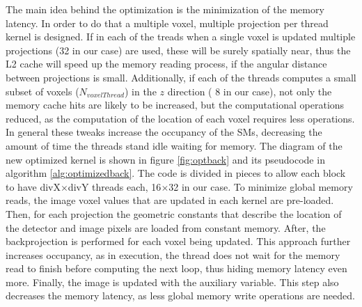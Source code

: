  The main idea behind the optimization is the minimization of the memory latency. In order to do that a multiple voxel, multiple projection per thread kernel is designed. If in each of the treads when a single voxel is updated multiple projections (32 in our case) are used, these will be surely spatially near, thus the L2 cache will speed up the memory reading process, if the angular distance between projections is small. Additionally, if each of the threads computes a small subset of voxels ($N_{voxelThread}$) in the $z$ direction ( 8 in our case), not only the memory cache hits are likely to be increased, but the computational operations reduced, as the computation of the location of each voxel requires less operations. In general these tweaks increase the occupancy of the SMs, decreasing the amount of time the threads stand idle waiting for memory. The diagram of the new optimized kernel is shown in figure \ref{fig:optback} and its pseudocode in algorithm \ref{alg:optimizedback}. The code is divided in pieces to allow each block to have divX$\times$divY threads each, 16$\times$32 in our case. To minimize global memory reads, the image voxel values that are updated in each kernel are pre-loaded. Then, for each projection the geometric constants that describe the location of the detector and image pixels are loaded from constant memory. After, the backprojection is performed for each voxel being updated. This approach further increases occupancy, as in execution, the thread does not wait for the memory read to finish before computing the next loop, thus hiding memory latency even more. Finally, the image is updated with the auxiliary variable. This step also decreases the memory latency, as less global memory write operations are needed.


